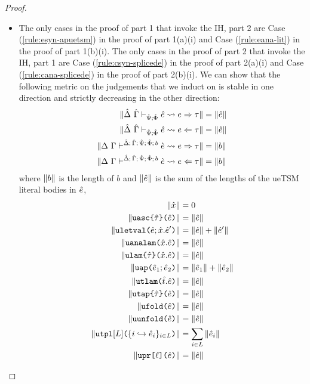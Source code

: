 \begin{proof}
\begin{itemize}
\item The only cases in the proof of part 1 that invoke the IH, part 2 are Case (\ref{rule:esyn-apuetsm}) in the proof of part 1(a)(i) and Case (\ref{rule:eana-lit}) in the proof of part 1(b)(i). The only cases in the proof of part 2 that invoke the IH, part 1 are Case (\ref{rule:csyn-splicede}) in the proof of part 2(a)(i) and Case (\ref{rule:cana-splicede}) in the proof of part 2(b)(i). We can show that the following metric on the judgements that we induct on is stable in one direction and strictly decreasing in the other direction:
\begin{align*}
\Vert \hat{\Delta}~\hat{\Gamma} \vdash_{\hat{\Psi}; \hat\Phi} {\hat e} \leadsto e \Rightarrow \tau \Vert & = \Vert {\hat e} \Vert\\
\Vert \hat{\Delta}~\hat{\Gamma} \vdash_{\hat{\Psi}; \hat\Phi} {\hat e} \leadsto e \Leftarrow \tau \Vert & = \Vert {\hat e} \Vert\\
\Vert \Delta~\Gamma \vdash^{\hat{\Delta};\,\hat{\Gamma};\,\hat{\Psi};\,\hat\Phi;\,b} \grave{e} \leadsto e \Rightarrow \tau \Vert & = \Vert b \Vert\\
\Vert \Delta~\Gamma \vdash^{\hat{\Delta};\,\hat{\Gamma};\,\hat{\Psi};\,\hat\Phi;\,b} \grave{e} \leadsto e \Leftarrow \tau \Vert & = \Vert b \Vert
\end{align*}
where $\Vert b \Vert$ is the length of $b$ and $\Vert {\hat e} \Vert$ is the sum of the lengths of the ueTSM literal bodies in ${\hat e}$,
\begin{align*}
\sizeof{\ux} & = 0\\
\sizeof{\auasc{\utau}{\ue}} & = \sizeof{\ue}\\
\sizeof{\auletsyn{\ux}{\ue}{\ue'}} & = \sizeof{\ue} + \sizeof{\ue'}\\
\sizeof{\auanalam{\ux}{\ue}} & = \sizeof{\ue}\\
\sizeof{\aulam{\utau}{\ux}{\ue}} &= \sizeof{\ue}\\
\sizeof{\auap{\ue_1}{\ue_2}} & = \sizeof{\ue_1} + \sizeof{\ue_2}\\
\sizeof{\autlam{\ut}{\ue}} & = \sizeof{\ue}\\
\sizeof{\autap{\ue}{\utau}} & = \sizeof{\ue}\\
\sizeof{\auanafold{\ue}} & = \sizeof{\ue}\\
\sizeof{\auunfold{\ue}} & = \sizeof{\ue}\\
\sizeof{\autpl{\labelset}{\mapschema{\ue}{i}{\labelset}}} & = \sum_{i \in \labelset} \sizeof{\ue_i}\\
\sizeof{\aupr{\ell}{\ue}} & = \sizeof{\ue}\\

\end{align*}
\end{itemize}
\end{proof}
